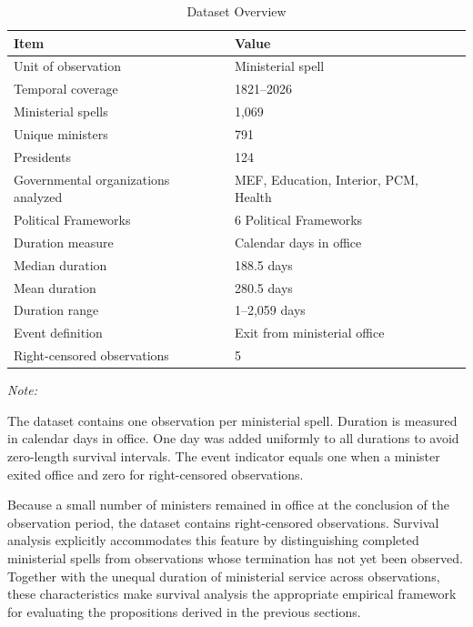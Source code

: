 \documentclass[doc, 12pt, a4paper,floatsintext]{apa7}
\begin{document}
\begin{table}[!h]
\centering
\caption{\label{tab:dataset_overview}Dataset Overview}
\centering
\fontsize{9}{11}\selectfont
\begin{threeparttable}
\begin{tabular}[t]{ll}
\toprule
Item & Value\\
\midrule
Unit of observation & Ministerial spell\\
Temporal coverage & 1821--2026\\
Ministerial spells & 1,069\\
Unique ministers & 791\\
Presidents & 124\\
\addlinespace
Governmental organizations analyzed & MEF, Education, Interior, PCM, Health\\
Political Frameworks & 6 Political Frameworks\\
Duration measure & Calendar days in office\\
Median duration & 188.5 days\\
Mean duration & 280.5 days\\
\addlinespace
Duration range & 1--2,059 days\\
Event definition & Exit from ministerial office\\
Right-censored observations & 5\\
\bottomrule
\end{tabular}
\begin{tablenotes}
\item \textit{Note: } 
\item The dataset contains one observation per ministerial spell. Duration is measured in calendar days in office. One day was added uniformly to all durations to avoid zero-length survival intervals. The event indicator equals one when a minister exited office and zero for right-censored observations.
\end{tablenotes}
\end{threeparttable}
\end{table}
Because a small number of ministers remained in office at the conclusion of the observation period, the dataset contains right-censored observations. Survival analysis explicitly accommodates this feature by distinguishing completed ministerial spells from observations whose termination has not yet been observed. Together with the unequal duration of ministerial service across observations, these characteristics make survival analysis the appropriate empirical framework for evaluating the propositions derived in the previous sections.
%
\end{document}
